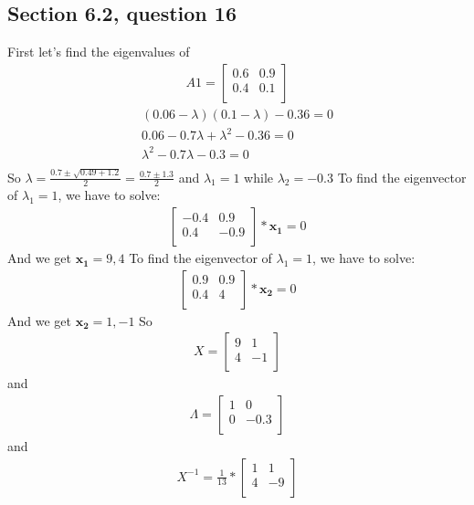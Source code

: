 \documentclass[a4paper,11pt]{article}
\newcommand{\mybf}[1]{\boldsymbol{#1}}
\begin{document}
\subsection*{Section 6.2, question 16}
First let's find the eigenvalues of 
\begin{align*}
A1=
\begin{bmatrix}
0.6 & 0.9 \\
0.4 & 0.1 \\
\end{bmatrix}
\end{align*}
\begin{align*}
(0.06-\lambda)(0.1-\lambda)-0.36=0\\
0.06-0.7\lambda+\lambda^2-0.36=0\\
\lambda^2-0.7\lambda-0.3=0\\
\end{align*}
So $\lambda=\frac{0.7 \pm \sqrt{0.49+1.2}}{2}=
\frac{0.7 \pm 1.3}{2}$ and $\lambda_1=1$ while $\lambda_2=-0.3$
To find the eigenvector of $\lambda_1=1$, we have to solve:
\begin{align*}
\begin{bmatrix}
-0.4 & 0.9 \\
0.4 & -0.9 \\
\end{bmatrix}
*\mybf{x_1}=0
\end{align*}
And we get $\mybf{x_1}={9,4}$
To find the eigenvector of $\lambda_1=1$, we have to solve:
\begin{align*}
\begin{bmatrix}
0.9 & 0.9 \\
0.4 & 4 \\
\end{bmatrix}
*\mybf{x_2}=0
\end{align*}
And we get $\mybf{x_2}={1,-1}$
So 
\begin{align*}
X = 
\begin{bmatrix}
9 & 1 \\
4 & -1 \\
\end{bmatrix}
\end{align*}
and
\begin{align*}
\Lambda = 
\begin{bmatrix}
1 & 0 \\
0 & -0.3 \\
\end{bmatrix}
\end{align*}
and 
\begin{align*}
X^{-1} =
\frac{1}{13} *
\begin{bmatrix}
1 & 1 \\
4 & -9 \\
\end{bmatrix}
\end{align*}
\end{document}
